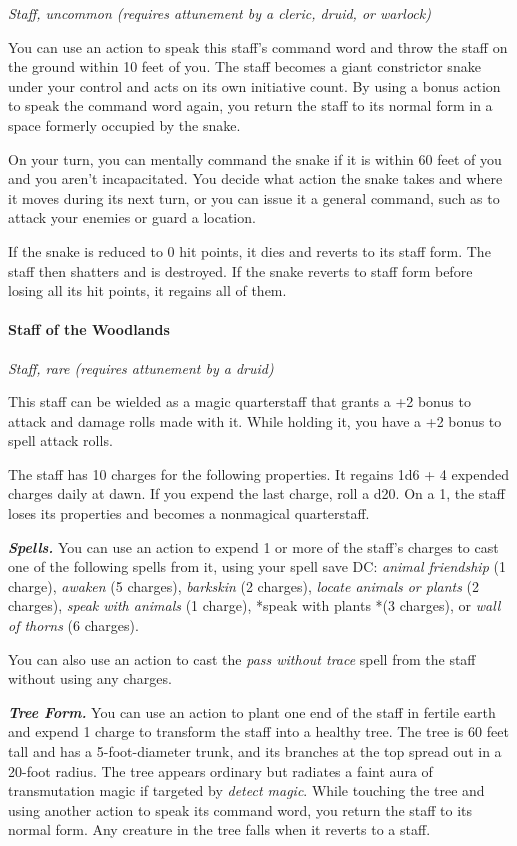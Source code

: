 \documentclass[
]{article}
\begin{document}
\emph{Staff, uncommon (requires attunement by a cleric, druid, or
warlock)}

You can use an action to speak this staff's command word and throw the
staff on the ground within 10 feet of you. The staff becomes a giant
constrictor snake under your control and acts on its own initiative
count. By using a bonus action to speak the command word again, you
return the staff to its normal form in a space formerly occupied by the
snake.

On your turn, you can mentally command the snake if it is within 60 feet
of you and you aren't incapacitated. You decide what action the snake
takes and where it moves during its next turn, or you can issue it a
general command, such as to attack your enemies or guard a location.

If the snake is reduced to 0 hit points, it dies and reverts to its
staff form. The staff then shatters and is destroyed. If the snake
reverts to staff form before losing all its hit points, it regains all
of them.

\hypertarget{staff-of-the-woodlands}{%
\paragraph{Staff of the Woodlands}\label{staff-of-the-woodlands}}

\emph{Staff, rare (requires attunement by a druid)}

This staff can be wielded as a magic quarterstaff that grants a +2 bonus
to attack and damage rolls made with it. While holding it, you have a +2
bonus to spell attack rolls.

The staff has 10 charges for the following properties. It regains 1d6 +
4 expended charges daily at dawn. If you expend the last charge, roll a
d20. On a 1, the staff loses its properties and becomes a nonmagical
quarterstaff.

\emph{\textbf{Spells.}} You can use an action to expend 1 or more of the
staff's charges to cast one of the following spells from it, using your
spell save DC: \emph{animal friendship} (1 charge), \emph{awaken} (5
charges), \emph{barkskin} (2 charges), \emph{locate animals or plants}
(2 charges), \emph{speak with animals} (1 charge), *speak with plants
*(3 charges), or \emph{wall of thorns} (6 charges).

You can also use an action to cast the \emph{pass without trace} spell
from the staff without using any charges.

\emph{\textbf{Tree Form.}} You can use an action to plant one end of the
staff in fertile earth and expend 1 charge to transform the staff into a
healthy tree. The tree is 60 feet tall and has a 5-foot-diameter trunk,
and its branches at the top spread out in a 20-foot radius. The tree
appears ordinary but radiates a faint aura of transmutation magic if
targeted by \emph{detect magic}. While touching the tree and using
another action to speak its command word, you return the staff to its
normal form. Any creature in the tree falls when it reverts to a staff.
\end{document}
